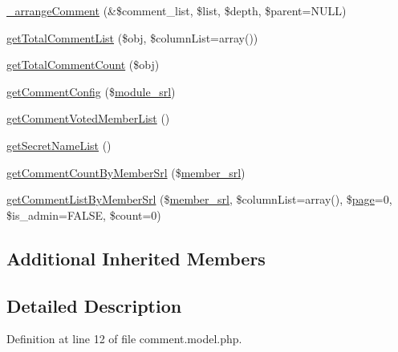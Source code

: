 \begin{DoxyCompactItemize}
\item 
\hyperlink{classcommentModel_a47ec9e90b14a5eb6108d22ab50b416d4}{\-\_\-arrange\-Comment} (\&\$comment\-\_\-list, \$list, \$depth, \$parent=N\-U\-L\-L)
\item 
\hyperlink{classcommentModel_abaac356ea7a0b2720034646c45b567ec}{get\-Total\-Comment\-List} (\$obj, \$column\-List=array())
\item 
\hyperlink{classcommentModel_a1854f15efa75a16e2edd603167d05e93}{get\-Total\-Comment\-Count} (\$obj)
\item 
\hyperlink{classcommentModel_a2e9bab595215a773f55c2400268d5bf6}{get\-Comment\-Config} (\$\hyperlink{ko_8install_8php_a370bb6450fab1da3e0ed9f484a38b761}{module\-\_\-srl})
\item 
\hyperlink{classcommentModel_a06f86d74df8aedbe4a4eba9704fd2d41}{get\-Comment\-Voted\-Member\-List} ()
\item 
\hyperlink{classcommentModel_ad05dafe1e96d761873a0b772eb1f749a}{get\-Secret\-Name\-List} ()
\item 
\hyperlink{classcommentModel_ad724212fb3664eeca8855af5d8944039}{get\-Comment\-Count\-By\-Member\-Srl} (\$\hyperlink{ko_8install_8php_aa61f9e08f0fe505094d26f8143f30bbd}{member\-\_\-srl})
\item 
\hyperlink{classcommentModel_ac5582cb271f13874b4d60a7fafe1f5b7}{get\-Comment\-List\-By\-Member\-Srl} (\$\hyperlink{ko_8install_8php_aa61f9e08f0fe505094d26f8143f30bbd}{member\-\_\-srl}, \$column\-List=array(), \$\hyperlink{classpage}{page}=0, \$is\-\_\-admin=F\-A\-L\-S\-E, \$count=0)
\end{DoxyCompactItemize}
\subsection*{Additional Inherited Members}


\subsection{Detailed Description}


Definition at line 12 of file comment.\-model.\-php.



